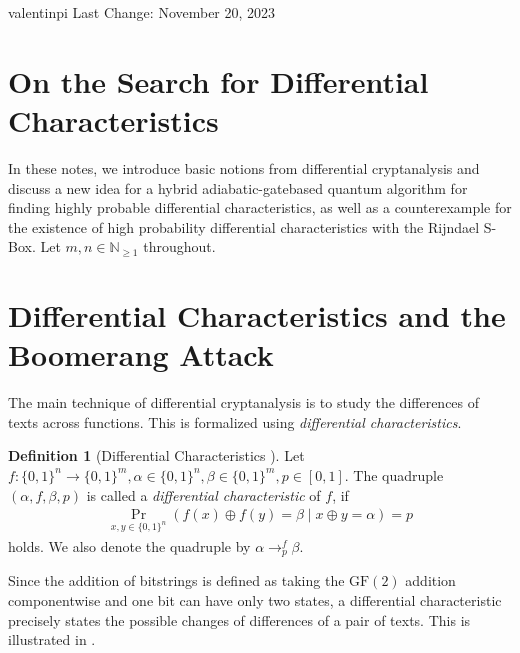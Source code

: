 \documentclass[10pt]{amsart}
\theoremstyle{definition}
\newtheorem{definition}{Definition}
\theoremstyle{remark}
\begin{document}
    valentinpi \hfill Last Change: November 20, 2023

    \section*{On the Search for Differential Characteristics}

    In these notes, we introduce basic notions from differential cryptanalysis and discuss a new idea for a hybrid adiabatic-gatebased quantum algorithm for finding highly probable differential characteristics, as well as a counterexample for the existence of high probability differential characteristics with the Rijndael S-Box. Let \(m, n \in \mathbb{N}_{\geq 1}\) throughout.

    \section{Differential Characteristics and the Boomerang Attack} The main technique of differential cryptanalysis is to study the differences of texts across functions. This is formalized using \emph{differential characteristics}.

    \begin{definition}[{Differential Characteristics \cite[p. 116]{Knudsen}}]
        Let \(f\colon \{0, 1\}^n \to \{0, 1\}^m, \alpha \in \{0, 1\}^n, \beta \in \{0, 1\}^m, p \in [0, 1]\). The quadruple \((\alpha, f, \beta, p)\) is called a \emph{differential characteristic} of \(f\), if
        \begin{align}
            \Pr_{x, y \in \{0, 1\}^n}(f(x) \oplus f(y) = \beta \mid x \oplus y = \alpha) = p
        \end{align}
        holds. We also denote the quadruple by \(\alpha \to_p^f \beta\).
    \end{definition}

    Since the addition of bitstrings is defined as taking the \(\text{GF}(2)\) addition componentwise and one bit can have only two states, a differential characteristic precisely states the possible changes of differences of a pair of texts. This is illustrated in .
\end{document}
